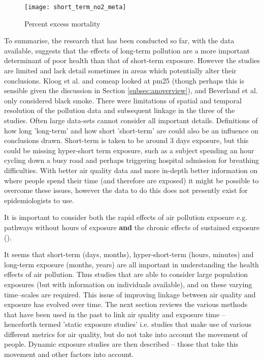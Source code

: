 \begin{figure}[H]
\centering
\texttt{[image: short\_term\_no2\_meta]}
\caption{Percent excess mortality}
\label{fig:short_term_no2_meta}
\end{figure}

To summarise, the research that has been conducted so far, with the data available, suggests that the effects of long-term pollution are a more important determinant of poor health than that of short-term exposure. However the studies are limited and lack detail sometimes in areas which potentially alter their conclusions. Kloog et al. and \gls{comeap} looked at \gls{pm25} (though perhaps this is sensible given the discussion in Section \ref{subsec:anoverview}), and Beverland et al. only considered black smoke. There were limitations of spatial and temporal resolution of the pollution data and subsequent linkage in the three of the studies. Often large data-sets cannot consider all important details. Definitions of how long 'long-term' and how short 'short-term' are could also be an influence on conclusions drawn. Short-term is taken to be around 3 days exposure, but this could be missing hyper-short term exposure, such as a subject spending an hour cycling down a busy road and perhaps triggering hospital admission for breathing difficulties. With better air quality data and more in-depth better information on where people spend their time (and therefore are exposed) it might be possible to overcome these issues, however the data to do this does not presently exist for epidemiologists to use.

It is important to consider both the rapid effects of air pollution exposure e.g. pathways without hours of exposure \textbf{and} the chronic effects of sustained exposure (\cite{Brook2010}).

It seems that short-term (days, months), hyper-short-term (hours, minutes) and long-term exposure (months, years) are all important in understanding the health effects of air pollution. Thus studies that are able to consider large population exposures (but with information on individuals available), and on these varying time--scales are required. This issue of improving linkage between air quality and exposure has evolved over time. The next section reviews the various methods that have been used in the past to link air quality and exposure time -- henceforth termed 'static exposure studies' i.e. studies that make use of various different metrics for air quality, but do not take into account the movement of people. Dynamic exposure studies are then described -- those that take this movement and other factors into account.

